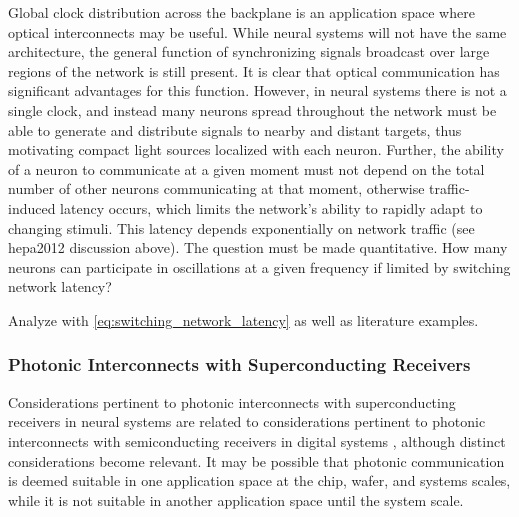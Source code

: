 Global clock distribution across the backplane is an application space where optical interconnects may be useful. While neural systems will not have the same architecture, the general function of synchronizing signals broadcast over large regions of the network is still present. It is clear that optical communication has significant advantages for this function. However, in neural systems there is not a single clock, and instead many neurons spread throughout the network must be able to generate and distribute signals to nearby and distant targets, thus motivating compact light sources localized with each neuron. Further, the ability of a neuron to communicate at a given moment must not depend on the total number of other neurons communicating at that moment, otherwise traffic-induced latency occurs, which limits the network's ability to rapidly adapt to changing stimuli. This latency depends exponentially on network traffic (see hepa2012 discussion above). The question must be made quantitative. How many neurons can participate in oscillations at a given frequency if limited by switching network latency?

Analyze with \ref{eq:switching_network_latency} as well as literature examples. 

\vspace{3em}
\cite{walo2018}


\subsubsection{Photonic Interconnects with Superconducting Receivers}
Considerations pertinent to photonic interconnects with superconducting receivers in neural systems are related to considerations pertinent to photonic interconnects with semiconducting receivers in digital systems \cite{mi2009,mi2017}, although distinct considerations become relevant. It may be possible that photonic communication is deemed suitable in one application space at the chip, wafer, and systems scales, while it is not suitable in another application space until the system scale. 

